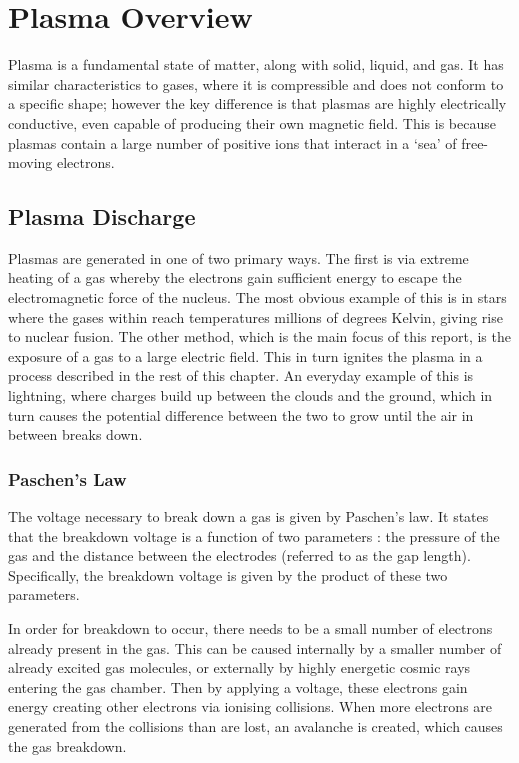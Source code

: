\chapter{Plasma Overview}
\label{ch:plasma_overview}

Plasma is a fundamental state of matter, along with solid, liquid, and gas. It has similar characteristics to gases, where it is compressible and does not conform to a specific shape; however the key difference is that plasmas are highly electrically conductive, even capable of producing their own magnetic field. This is because plasmas contain a large number of positive ions that interact in a `sea' of free-moving electrons.

\section{Plasma Discharge}

Plasmas are generated in one of two primary ways. The first is via extreme heating of a gas whereby the electrons gain sufficient energy to escape the electromagnetic force of the nucleus. The most obvious example of this is in stars where the gases within reach temperatures millions of degrees Kelvin, giving rise to nuclear fusion. The other method, which is the main focus of this report, is the exposure of a gas to a large electric field. This in turn ignites the plasma in a process described in the rest of this chapter. An everyday example of this is lightning, where charges build up between the clouds and the ground, which in turn causes the potential difference between the two to grow until the air in between breaks down.

\subsection{Paschen's Law}
\label{sec:paschens_law}

The voltage necessary to break down a gas is given by Paschen's law. It states that the breakdown voltage is a function of two parameters \cite{Lieberman2005}: the pressure of the gas and the distance between the electrodes (referred to as the gap length). Specifically, the breakdown voltage is given by the product of these two parameters.

In order for breakdown to occur, there needs to be a small number of electrons already present in the gas. This can be caused internally by a smaller number of already excited gas molecules, or externally by highly energetic cosmic rays entering the gas chamber. Then by applying a voltage, these electrons gain energy creating other electrons via ionising collisions. When more electrons are generated from the collisions than are lost, an avalanche is created, which causes the gas breakdown.

